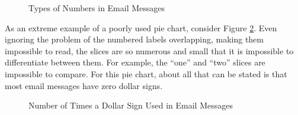 \begin{figure}[H]
  \begin{center}
    \caption{Types of Numbers in Email Messages}
    \label{lab02_fig13}
  \end{center}
\end{figure}

As an extreme example of a poorly used pie chart, consider Figure \ref{lab02_fig14}. Even ignoring the problem of the numbered labels overlapping, making them impossible to read, the slices are so numerous and small that it is impossible to differentiate between them. For example, the ``one'' and ``two'' slices are impossible to compare. For this pie chart, about all that can be stated is that most email messages have zero dollar signs.

\begin{figure}[H]
  \begin{center}
    \caption{Number of Times a Dollar Sign Used in Email Messages}
    \label{lab02_fig14}
  \end{center}
\end{figure}

